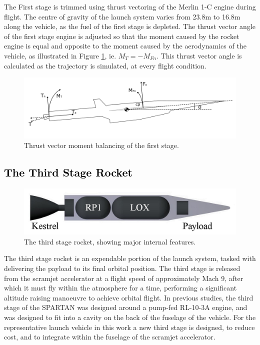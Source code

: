   The First stage is trimmed using thrust vectoring of the Merlin 1-C engine during flight. The centre of gravity of the launch system varies from 23.8m to 16.8m along the vehicle, as the fuel of the first stage is depleted. The thrust vector angle of the first stage engine is adjusted so that the moment caused by the rocket engine is equal and opposite to the moment caused by the aerodynamics of the vehicle, as illustrated in Figure \ref{fig:FirstStageThrustVec}, ie. $M_T = -M_{Fn}$.
  This thrust vector angle is calculated as the trajectory is simulated, at every flight condition. 
 

\begin{figure}
\centering
\includegraphics[width=0.9\linewidth]{figures/3_vehicle_design/FirstStageThrustVec}
\caption{Thrust vector moment balancing of the first stage.}
\label{fig:FirstStageThrustVec}
\end{figure}
  
  
  



	

	\textcolor{black}{\section{The Third Stage Rocket}\label{sec:ThirdStageBaseline}}

	\begin{figure}[ht]
\centering
\includegraphics[width=0.7\linewidth]{figures/3_vehicle_design/3rdStage}
\caption{The third stage rocket, showing major internal features. }
\label{fig:3rdStage}
\end{figure}
\noindent
The third stage rocket is an expendable portion of the launch system, tasked with delivering the payload to its final orbital position. 
  The third stage is released from the scramjet accelerator at a flight speed of approximately Mach 9, after which it must fly within the atmosphere for a time, performing a significant altitude raising manoeuvre to achieve orbital flight\cite{Preller2017b}. 
  In previous studies, the third stage of the SPARTAN was designed around a pump-fed RL-10-3A engine\cite{Preller2017b}, and was designed to fit into a cavity on the back of the fuselage of the vehicle\cite{Preller2017b}. For the representative launch vehicle in this work a new third stage is designed, to reduce cost, and to integrate within the fuselage of the scramjet accelerator. 
   
